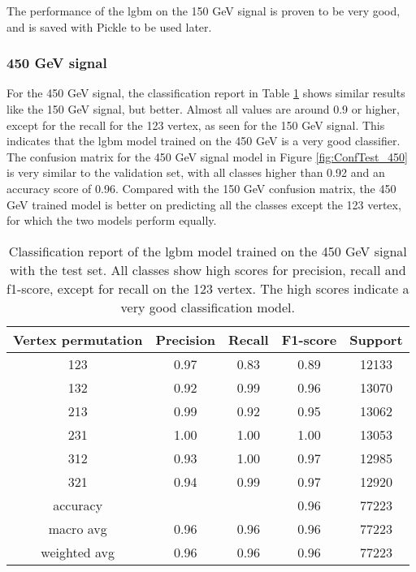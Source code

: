 \documentclass[a4paper, american, 12pt]{report}
\begin{document}
	The performance of the \acrshort{lgbm} on the 150 GeV signal is proven to be very good, and is saved with Pickle to be used later.
	

	\subsubsection{450 GeV signal}
	\label{subsect:Result-Test450}
	For the 450 GeV signal, the classification report in Table \ref{tab:ClassReport_450} shows similar results like the 150 GeV signal, but better. Almost all values are around 0.9 or higher, except for the recall for the 123 vertex, as seen for the 150 GeV signal. This indicates that the \acrshort{lgbm} model trained on the 450 GeV is a very good classifier. The confusion matrix for the 450 GeV signal model in Figure \ref{fig:ConfTest_450} is very similar to the validation set, with all classes higher than 0.92 and an accuracy score of 0.96. Compared with the 150 GeV confusion matrix, the 450 GeV trained model is better on predicting all the classes except the 123 vertex, for which the two models perform equally.
	\begin{table}[ht!]
		\centering
		\begin{tabular}{ |c|c|c|c|c| }
			\hline \rule{0pt}{13pt}
			Vertex permutation & Precision & Recall & F1-score & Support \\
			\hline \rule{0pt}{13pt}
			123 & 0.97 & 0.83 & 0.89 & 12133 \\
			\hline \rule{0pt}{13pt}
			132 & 0.92 & 0.99 & 0.96 & 13070 \\
			\hline \rule{0pt}{13pt}
			213 & 0.99 & 0.92 & 0.95 & 13062 \\
			\hline \rule{0pt}{13pt}
			231 & 1.00 & 1.00 & 1.00 & 13053  \\
			\hline \rule{0pt}{13pt}
			312 & 0.93 & 1.00 &  0.97 & 12985 \\
			\hline \rule{0pt}{13pt}
			321 & 0.94 & 0.99 & 0.97 & 12920 \\
			\hline \rule{0pt}{13pt}
			accuracy &   &   &  0.96 & 77223 \\
			\hline \rule{0pt}{13pt}
			macro avg & 0.96  & 0.96 & 0.96 & 77223 \\
			\hline \rule{0pt}{13pt}
			weighted avg & 0.96 & 0.96 & 0.96 & 77223 \\
			\hline
		\end{tabular}	         
		\caption[Classification report of the \acrshort{lgbm} model trained on the 450 GeV signal.]{Classification report of the \acrshort{lgbm} model trained on the 450 GeV signal with the test set. All classes show high scores for precision, recall and f1-score, except for recall on the 123 vertex. The high scores indicate a very good classification model.}
		\label{tab:ClassReport_450}
	\end{table}
\end{document}
